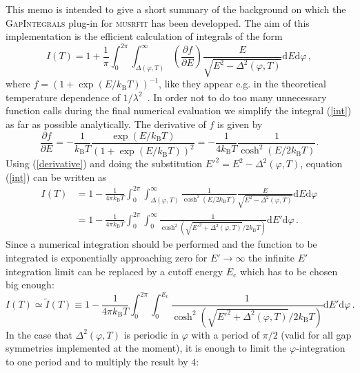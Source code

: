 \documentclass[twoside]{article}
\newcommand{\musrfit}{\textsc{musrfit}\xspace}
\newcommand{\gapint}{\textsc{GapIntegrals}\xspace}
\begin{document}
This memo is intended to give a short summary of the background on which the \gapint plug-in for \musrfit \cite{musrfit} has been developped. The aim of this implementation is the efficient calculation of integrals of the form
\begin{equation}\label{int}
 I(T) = 1 + \frac{1}{\pi}\int_0^{2\pi}\int_{\Delta(\varphi,T)}^{\infty}\left(\frac{\partial f}{\partial E}\right) \frac{E}{\sqrt{E^2-\Delta^2(\varphi,T)}}\mathrm{d}E\mathrm{d}\varphi\,,
\end{equation}
where $f = (1+\exp(E/k_{\mathrm B}T))^{-1}$, like they appear e.g. in the theoretical temperature dependence of $1/\lambda^2$~\cite{Manzano}.
In order not to do too many unnecessary function calls during the final numerical evaluation we simplify the integral (\ref{int}) as far as possible analytically. The derivative of $f$ is given by
\begin{equation}\label{derivative}
\frac{\partial f}{\partial E} = -\frac{1}{k_{\mathrm B}T}\frac{\exp(E/k_{\mathrm B}T)}{\left(1+\exp(E/k_{\mathrm B}T)\right)^2} = -\frac{1}{4k_{\mathrm B}T} \frac{1}{\cosh^2\left(E/2k_{\mathrm B}T\right)}.
\end{equation}
Using (\ref{derivative}) and doing the substitution $E'^2 = E^2-\Delta^2(\varphi,T)$, equation (\ref{int}) can be written as
\begin{equation}
\begin{split}
I(T) & = 1 - \frac{1}{4\pi k_{\mathrm B}T}\int_0^{2\pi}\int_{\Delta(\varphi,T)}^{\infty}\frac{1}{\cosh^2\left(E/2k_{\mathrm B}T\right)}\frac{E}{\sqrt{E^2-\Delta^2(\varphi,T)}}\mathrm{d}E\mathrm{d}\varphi \\
& = 1 - \frac{1}{4\pi k_{\mathrm B}T}\int_0^{2\pi}\int_{0}^{\infty}\frac{1}{\cosh^2\left(\sqrt{E'^2+\Delta^2(\varphi,T)}/2k_{\mathrm B}T\right)}\mathrm{d}E'\mathrm{d}\varphi\,.
\end{split}
\end{equation}
Since a numerical integration should be performed and the function to be integrated is exponentially approaching zero for $E'\rightarrow\infty$ the infinite $E'$ integration limit can be replaced by a cutoff energy $E_{\mathrm c}$ which has to be chosen big enough:
\begin{equation}
I(T) \simeq \tilde{I}(T) \equiv 1 - \frac{1}{4\pi k_{\mathrm B}T}\int_0^{2\pi}\int_{0}^{E_{\mathrm c}}\frac{1}{\cosh^2\left(\sqrt{E'^2+\Delta^2(\varphi,T)}/2k_{\mathrm B}T\right)}\mathrm{d}E'\mathrm{d}\varphi\,.
\end{equation}
In the case that $\Delta^2(\varphi,T)$ is periodic in $\varphi$ with a period of $\pi/2$ (valid for all gap symmetries implemented at the moment), it is enough to limit the $\varphi$-integration to one period and to multiply the result by $4$:
\end{document}
